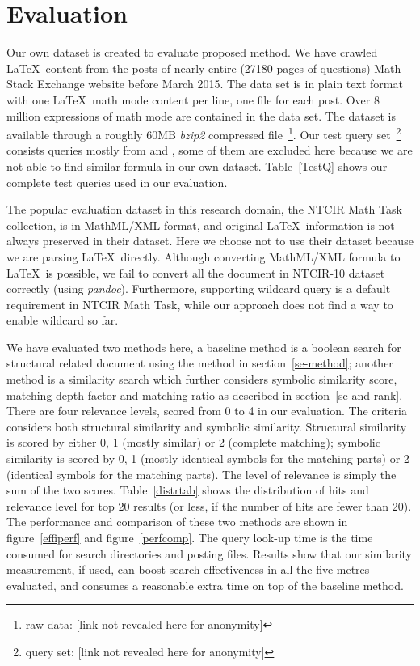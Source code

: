 \documentclass{acm_proc_article-sp}
\begin{document}
\section{Evaluation}
Our own dataset is created to evaluate proposed method.
We have crawled \LaTeX\ content from the posts of nearly entire (27180 pages of questions) Math Stack Exchange website before March 2015. 
The data set is in plain text format with one \LaTeX\ math mode content per line, one file for each post. 
Over 8 million expressions of math mode are contained in the data set. 
The dataset is available through a roughly 60MB \textit{bzip2} compressed file~\footnote{raw data: [link not revealed here for anonymity]}.
Our test query set~\footnote{query set: [link not revealed here for anonymity]} consists queries mostly from \cite{ntcirtopic} and \cite{symbolpairs15}, some of them are excluded here because we are not able to find similar formula in our own dataset.
Table~\ref{TestQ} shows our complete test queries used in our evaluation. 

The popular evaluation dataset in this research domain, the NTCIR Math Task collection, is in MathML/XML format, and original \LaTeX\ information is not always preserved in their dataset. 
Here we choose not to use their dataset because we are parsing \LaTeX\ directly.
Although converting MathML/XML formula to \LaTeX\ is possible, we fail to convert all the document in NTCIR-10 dataset correctly (using \textit{pandoc}).
Furthermore, supporting wildcard query is a default requirement in NTCIR Math Task, while our approach does not find a way to enable wildcard so far.

We have evaluated two methods here, a baseline method is a boolean search for structural related document using the method in section~\ref{se-method}; another method is a similarity search which further considers symbolic similarity score, matching depth factor and matching ratio as described in section~\ref{se-and-rank}.
There are four relevance levels, scored from 0 to 4 in our evaluation.
The criteria considers both structural similarity and symbolic similarity. 
Structural similarity is scored by either 0, 1 (mostly similar) or 2 (complete matching);
symbolic similarity is scored by 0, 1 (mostly identical symbols for the matching parts) or 2 (identical symbols for the matching parts).
The level of relevance is simply the sum of the two scores.
Table~\ref{distrtab} shows the distribution of hits and relevance level for top 20 results (or less, if the number of hits are fewer than 20).
The performance and comparison of these two methods are shown in figure~\ref{effiperf} and figure~\ref{perfcomp}. 
The query look-up time is the time consumed for search directories and posting files.
Results show that our similarity measurement, if used, can boost search effectiveness in all the five metres evaluated, 
and consumes a reasonable extra time on top of the baseline method. 
\end{document}
